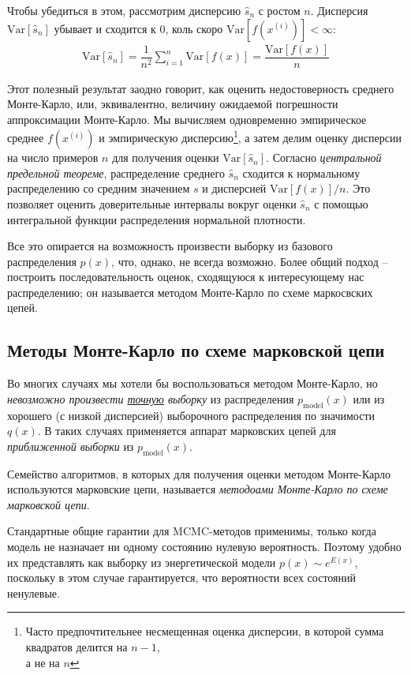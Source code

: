 \documentclass[%
	11pt,
	a4paper,
	utf8,
]{article}
\begin{document}
Чтобы убедиться в этом, рассмотрим дисперсию $ \hat{s}_n $ с ростом $ n $. Дисперсия $ \text{Var}[\hat{s}_n] $ убывает и сходится к 0, коль скоро $ \text{Var}[f(x^{(i)})] < \infty $:
\begin{align*}
	\text{Var}[\hat{s}_n] = \dfrac{1}{n^2} \sum_{i=1}^n \text{Var}[f(x)] = \dfrac{ \text{Var}[f(x)] }{n}
\end{align*}

Этот полезный результат заодно говорит, как оценить недостоверность среднего Монте-Карло, или, эквивалентно, величину ожидаемой погрешности аппроксимации Монте-Карло. Мы вычисляем одновременно эмпирическое среднее $ f(x^{(i)}) $ и эмпирическую дисперсию\footnote{ Часто предпочтительнее несмещенная оценка дисперсии, в которой сумма квадратов делится на $ n - 1 $, \\а не на $ n $ }, а затем делим оценку дисперсии на число примеров $ n $ для получения оценки $ \text{Var}[\hat{s}_n ] $. Согласно \emph{центральной предельной теореме}, распределение среднего $ \hat{s}_n $ сходится к нормальному распределению со средним значением $ s $ и дисперсией $ \text{Var}[f(x)] / n $. Это позволяет оценить доверительные интервалы вокруг оценки $ \hat{s}_n $ с помощью интегральной функции распределения нормальной плотности.

Все это опирается на возможность произвести выборку из базового распределения $ p(x) $, что, однако, не всегда возможно. Более общий подход -- построить последовательность оценок, сходящуюся к интересующему нас распределению; он называется методом Монте-Карло по схеме маркосвских цепей.

\subsection{Методы Монте-Карло по схеме марковской цепи}

Во многих случаях мы хотели бы воспользоваться методом Монте-Карло, но \emph{невозможно произвести \underline{точную} выборку} из распределения $ p_{\text{model}}(x) $ или из хорошего (с низкой дисперсией) выборочного распределения по значимости $ q(x) $. В таких случаях применяется аппарат марковских цепей для \emph{приближенной выборки} из $ p_{\text{model}}(x) $. 

Семейство алгоритмов, в которых для получения оценки методом Монте-Карло используются марковские цепи, называется \emph{методоами Монте-Карло по схеме марковской цепи}.

Стандартные общие гарантии для MCMC-методов применимы, только когда модель не назначает ни одному состоянию нулевую вероятность. Поэтому удобно их представлять как выборку из энергетической модели $ p(x) \sim e^{ E(x) } $, поскольку в этом случае гарантируется, что вероятности всех состояний ненулевые.
\end{document}
